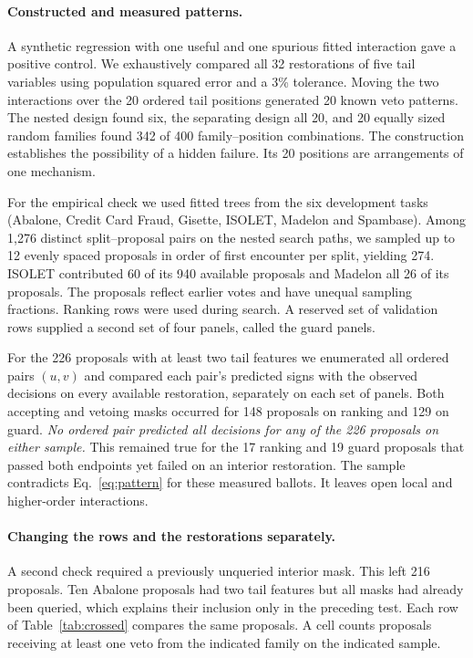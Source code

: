 \paragraph{Constructed and measured patterns.}
A synthetic regression with one useful and one spurious fitted interaction gave a positive control. We exhaustively compared all 32 restorations of five tail variables using population squared error and a 3\% tolerance. Moving the two interactions over the 20 ordered tail positions generated 20 known veto patterns. The nested design found six, the separating design all 20, and 20 equally sized random families found 342 of 400 family--position combinations. The construction establishes the possibility of a hidden failure. Its 20 positions are arrangements of one mechanism.

For the empirical check we used fitted trees from the six development tasks (Abalone, Credit Card Fraud, Gisette, ISOLET, Madelon and Spambase). Among 1,276 distinct split--proposal pairs on the nested search paths, we sampled up to 12 evenly spaced proposals in order of first encounter per split, yielding 274. ISOLET contributed 60 of its 940 available proposals and Madelon all 26 of its proposals. The proposals reflect earlier votes and have unequal sampling fractions. Ranking rows were used during search. A reserved set of validation rows supplied a second set of four panels, called the guard panels.

For the 226 proposals with at least two tail features we enumerated all ordered pairs $(u,v)$ and compared each pair's predicted signs with the observed decisions on every available restoration, separately on each set of panels. Both accepting and vetoing masks occurred for 148 proposals on ranking and 129 on guard. \emph{No ordered pair predicted all decisions for any of the 226 proposals on either sample.} This remained true for the 17 ranking and 19 guard proposals that passed both endpoints yet failed on an interior restoration. The sample contradicts Eq.~\eqref{eq:pattern} for these measured ballots. It leaves open local and higher-order interactions.

\paragraph{Changing the rows and the restorations separately.}
A second check required a previously unqueried interior mask. This left 216 proposals. Ten Abalone proposals had two tail features but all masks had already been queried, which explains their inclusion only in the preceding test. Each row of Table~\ref{tab:crossed} compares the same proposals. A cell counts proposals receiving at least one veto from the indicated family on the indicated sample.

